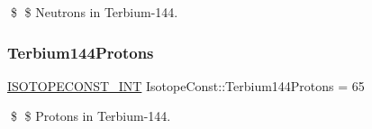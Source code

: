 \$ \$ Neutrons in Terbium-\/144. \mbox{\label{group___isotope_const-_terbium-_tb144_ga465229d3a58118c1279a925718c5e82e}} 
\subsubsection{\texorpdfstring{Terbium144\+Protons}{Terbium144Protons}}
{\footnotesize\ttfamily \mbox{\hyperlink{group___isotope_const-_macros_ga5f18360b3e99483a35c32d789e62621c}{I\+S\+O\+T\+O\+P\+E\+C\+O\+N\+S\+T\+\_\+\+I\+NT}} Isotope\+Const\+::\+Terbium144\+Protons = 65}

\$ \$ Protons in Terbium-\/144. 